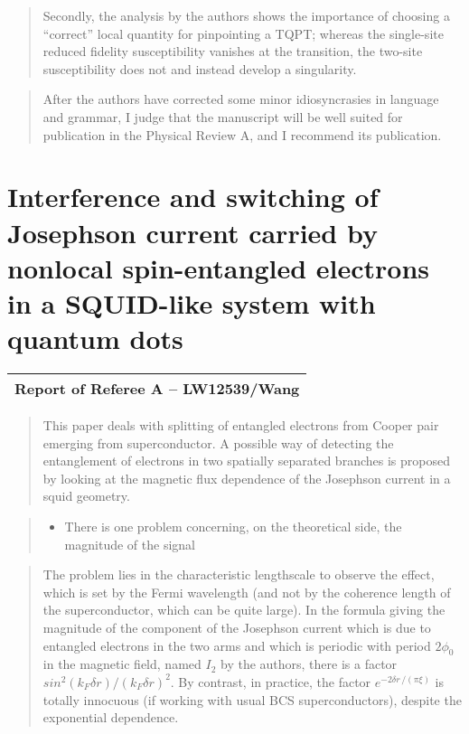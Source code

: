 \documentclass[11pt]{article}
\providecommand{\tightlist}{%
      \setlength{\itemsep}{0pt}\setlength{\parskip}{0pt}}
\begin{document}
\begin{quote}
Secondly, the analysis by the authors shows the importance of choosing a
``correct'' local quantity for pinpointing a TQPT; whereas the
single-site reduced fidelity susceptibility vanishes at the transition,
the two-site susceptibility does not and instead develop a singularity.
\end{quote}

\begin{quote}
After the authors have corrected some minor idiosyncrasies in language
and grammar, I judge that the manuscript will be well suited for
publication in the Physical Review A, and I recommend its publication.
\end{quote}

    \hypertarget{interference-and-switching-of-josephson-current-carried-by-nonlocal-spin-entangled-electrons-in-a-squid-like-system-with-quantum-dots}{%
\section{Interference and switching of Josephson current carried by
nonlocal spin-entangled electrons in a SQUID-like system with quantum
dots}\label{interference-and-switching-of-josephson-current-carried-by-nonlocal-spin-entangled-electrons-in-a-squid-like-system-with-quantum-dots}}

\begin{longtable}[]{@{}l@{}}
\toprule
\endhead
Report of Referee A -- LW12539/Wang\tabularnewline
\bottomrule
\end{longtable}

\begin{quote}
This paper deals with splitting of entangled electrons from Cooper pair
emerging from superconductor. A possible way of detecting the
entanglement of electrons in two spatially separated branches is
proposed by looking at the magnetic flux dependence of the Josephson
current in a squid geometry.
\end{quote}

\begin{quote}
\begin{itemize}
\tightlist
\item
  There is one problem concerning, on the theoretical side, the
  magnitude of the signal
\end{itemize}
\end{quote}

\begin{quote}
The problem lies in the characteristic lengthscale to observe the
effect, which is set by the Fermi wavelength (and not by the coherence
length of the superconductor, which can be quite large). In the formula
giving the magnitude of the component of the Josephson current which is
due to entangled electrons in the two arms and which is periodic with
period \(2 \phi_0\) in the magnetic field, named \(I_2\) by the authors,
there is a factor \(sin^2(k_F \delta r)/(k_F \delta r)^2\). By contrast,
in practice, the factor \(e^{- 2 \delta r \, / (\pi \xi)}\) is totally
innocuous (if working with usual BCS superconductors), despite the
exponential dependence.
\end{quote}
\end{document}

